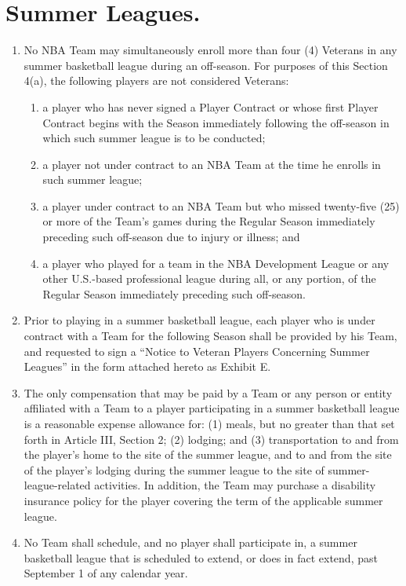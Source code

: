 \documentclass[
]{book}
\providecommand{\tightlist}{%
  \setlength{\itemsep}{0pt}\setlength{\parskip}{0pt}}
\begin{document}
\hypertarget{summer-leagues.}{%
\section{Summer Leagues.}\label{summer-leagues.}}

\begin{enumerate}
\def\labelenumi{(\alph{enumi})}
\tightlist
\item
  No NBA Team may simultaneously enroll more than four (4) Veterans in any summer basketball league during an off-season. For purposes of this Section 4(a), the following players are not considered Veterans:

  \begin{enumerate}
  \def\labelenumii{(\arabic{enumii})}
  \tightlist
  \item
    a player who has never signed a Player Contract or whose first Player Contract begins with the Season immediately following the off-season in which such summer league is to be conducted;
  \item
    a player not under contract to an NBA Team at the time he enrolls in such summer league;
  \item
    a player under contract to an NBA Team but who missed twenty-five (25) or more of the Team's games during the Regular Season immediately preceding such off-season due to injury or illness; and
  \item
    a player who played for a team in the NBA Development League or any other U.S.-based professional league during all, or any portion, of the Regular Season immediately preceding such off-season.
  \end{enumerate}
\item
  Prior to playing in a summer basketball league, each player who is under contract with a Team for the following Season shall be provided by his Team, and requested to sign a ``Notice to Veteran Players Concerning Summer Leagues'' in the form attached hereto as Exhibit E.
\item
  The only compensation that may be paid by a Team or any person or entity affiliated with a Team to a player participating in a summer basketball league is a reasonable expense allowance for: (1) meals, but no greater than that set forth in Article III, Section 2; (2) lodging; and (3) transportation to and from the player's home to the site of the summer league, and to and from the site of the player's lodging during the summer league to the site of summer-league-related activities. In addition, the Team may purchase a disability insurance policy for the player covering the term of the applicable summer league.
\item
  No Team shall schedule, and no player shall participate in, a summer basketball league that is scheduled to extend, or does in fact extend, past September 1 of any calendar year.
\end{enumerate}
\end{document}
